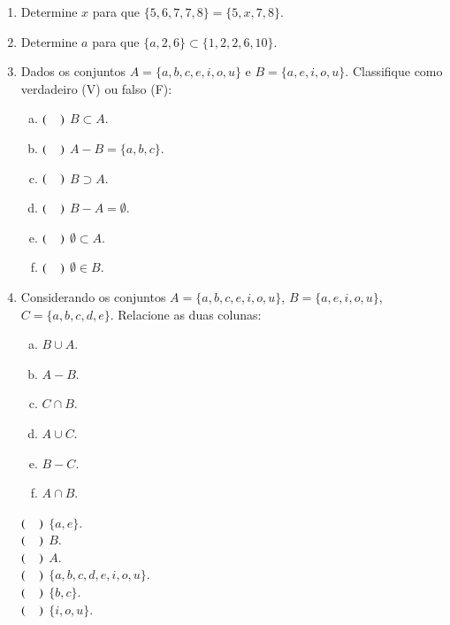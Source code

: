 \begin{enumerate}
 \item Determine $x$ para que $\{5,6,7,7,8\}= \{5,x,7,8\}$.
 \vskip0.5cm
 
 \item Determine $a$ para que $\{a,2,6\} \subset \{1,2,2,6,10\}$.
 \vskip0.5cm
 
 \item Dados os conjuntos $A=\{a, b, c, e, i, o, u\}$ e $B=\{a, e, i, o, u\}$. Classifique como verdadeiro (V) ou falso (F):
 \begin{multicols}{2}
 \begin{enumerate}[a)]
 \item $(\hspace{0.4cm})$ $B \subset A$.
 \item $(\hspace{0.4cm})$ $A-B= \{a, b, c\}$.
 \item $(\hspace{0.4cm})$ $B \supset A$.
 \item $(\hspace{0.4cm})$ $B-A= \emptyset$.
 \item $(\hspace{0.4cm})$ $\emptyset \subset A$.
 \item $(\hspace{0.4cm})$ $\emptyset \in B$.
 \end{enumerate}
 \end{multicols}
 
 \item Considerando os conjuntos $A=\{a, b, c, e, i, o, u\}$, $B=\{a, e, i, o, u\}$, $C=\{a,b,c,d,e\}$. Relacione as duas colunas:
 \begin{multicols}{2}
   \begin{enumerate}[a)]
 \item $B \cup A$.
 \item $A-B$.
 \item $C \cap B$.
 \item $A \cup C$.
 \item $B - C $.
 \item $A \cap B $.
 \end{enumerate}
 
  $(\hspace{0.4cm})$ $\{a,e\}$.\\
  $(\hspace{0.4cm})$ $B$.\\
  $(\hspace{0.4cm})$ $A$.\\
  $(\hspace{0.4cm})$ $\{a,b,c,d,e,i,o,u\}$.\\
  $(\hspace{0.4cm})$ $\{b, c\}$.\\
  $(\hspace{0.4cm})$ $\{i,o,u\}$.
 
 \end{multicols}


\end{enumerate}


